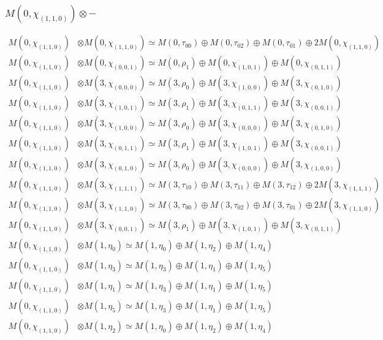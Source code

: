 \subsubsection{$ M(0,\chi_{(1,1,0)})\otimes -$}
\begin{align*}
M(0,\chi_{(1,1,0)}) &\otimes M(0,\chi_{(1,1,0)}) \simeq M(0,\tau_{00}) \oplus M(0,\tau_{02}) \oplus M(0,\tau_{01}) \oplus 2 M(0,\chi_{(1,1,0)})\\
M(0,\chi_{(1,1,0)}) &\otimes M(0,\chi_{(0,0,1)}) \simeq M(0,\rho_{1}) \oplus M(0,\chi_{(1,0,1)}) \oplus M(0,\chi_{(0,1,1)})\\
M(0,\chi_{(1,1,0)}) &\otimes M(3,\chi_{(0,0,0)}) \simeq M(3,\rho_{0}) \oplus M(3,\chi_{(1,0,0)}) \oplus M(3,\chi_{(0,1,0)})\\
M(0,\chi_{(1,1,0)}) &\otimes M(3,\chi_{(1,0,1)}) \simeq M(3,\rho_{1}) \oplus M(3,\chi_{(0,1,1)}) \oplus M(3,\chi_{(0,0,1)})\\
M(0,\chi_{(1,1,0)}) &\otimes M(3,\chi_{(1,0,0)}) \simeq M(3,\rho_{0}) \oplus M(3,\chi_{(0,0,0)}) \oplus M(3,\chi_{(0,1,0)})\\
M(0,\chi_{(1,1,0)}) &\otimes M(3,\chi_{(0,1,1)}) \simeq M(3,\rho_{1}) \oplus M(3,\chi_{(1,0,1)}) \oplus M(3,\chi_{(0,0,1)})\\
M(0,\chi_{(1,1,0)}) &\otimes M(3,\chi_{(0,1,0)}) \simeq M(3,\rho_{0}) \oplus M(3,\chi_{(0,0,0)}) \oplus M(3,\chi_{(1,0,0)})\\
M(0,\chi_{(1,1,0)}) &\otimes M(3,\chi_{(1,1,1)}) \simeq M(3,\tau_{10}) \oplus M(3,\tau_{11}) \oplus M(3,\tau_{12}) \oplus 2 M(3,\chi_{(1,1,1)})\\
M(0,\chi_{(1,1,0)}) &\otimes M(3,\chi_{(1,1,0)}) \simeq M(3,\tau_{00}) \oplus M(3,\tau_{02}) \oplus M(3,\tau_{01}) \oplus 2 M(3,\chi_{(1,1,0)})\\
M(0,\chi_{(1,1,0)}) &\otimes M(3,\chi_{(0,0,1)}) \simeq M(3,\rho_{1}) \oplus M(3,\chi_{(1,0,1)}) \oplus M(3,\chi_{(0,1,1)})\\
M(0,\chi_{(1,1,0)}) &\otimes M(1,\eta_{0}) \simeq M(1,\eta_{0}) \oplus M(1,\eta_{2}) \oplus M(1,\eta_{4})\\
M(0,\chi_{(1,1,0)}) &\otimes M(1,\eta_{3}) \simeq M(1,\eta_{3}) \oplus M(1,\eta_{1}) \oplus M(1,\eta_{5})\\
M(0,\chi_{(1,1,0)}) &\otimes M(1,\eta_{1}) \simeq M(1,\eta_{3}) \oplus M(1,\eta_{1}) \oplus M(1,\eta_{5})\\
M(0,\chi_{(1,1,0)}) &\otimes M(1,\eta_{5}) \simeq M(1,\eta_{3}) \oplus M(1,\eta_{1}) \oplus M(1,\eta_{5})\\
M(0,\chi_{(1,1,0)}) &\otimes M(1,\eta_{2}) \simeq M(1,\eta_{0}) \oplus M(1,\eta_{2}) \oplus M(1,\eta_{4})\\

\end{align*}
